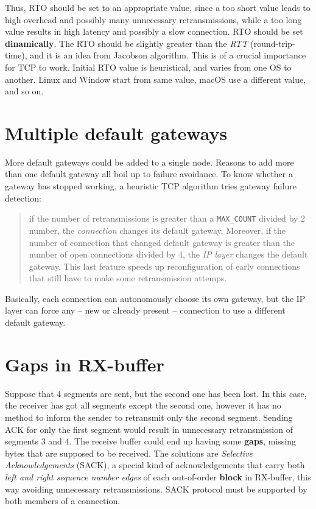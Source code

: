 \documentclass[a4paper, 11pt]{report}
\begin{document}
Thus, RTO should be set to an appropriate value, since a too short value leads
to high overhead and possibly many unnecessary retransmissions, while a too
long value results in high latency and possibly a slow connection. RTO should
be set \textbf{dinamically}. The RTO should be slightly greater than the
\emph{RTT} (round-trip-time), and it is an idea from Jacobson algorithm. This
is of a crucial importance for TCP to work. Initial RTO value is heuristical,
and varies from one OS to another. Linux and Window start from same value,
macOS use a different value, and so on.

\section{Multiple default gateways}

More default gateways could be added to a single node. Reasons to add more than
one default gateway all boil up to failure avoidance. To know whether a gateway
has stopped working, a heuristic TCP algorithm tries gateway failure detection:

\begin{quote}
	if the number of retransmissions is greater than a \texttt{MAX\_COUNT}
	divided by 2 number, the \emph{connection} changes its default gateway.
	Moreover, if the number of connection that changed default gateway is
	greater than the number of open connections divided by 4, the \emph{IP
	layer} changes the default gateway. This last feature speeds up
	reconfiguration of early connections that still have to make some
	retransmission attemps.
\end{quote}

Basically, each connection can autonomously choose its own gateway, but the IP
layer can force any \--- new or already present \--- connection to use a
different default gateway.

\section{Gaps in RX-buffer}

Suppose that 4 segments are sent, but the second one has been lost. In this
case, the receiver has got all segments except the second one, however it has
no method to inform the sender to retransmit only the second segment. Sending
ACK for only the first segment would result in unnecessary retransmission of
segments 3 and 4. The receive buffer could end up having some \textbf{gaps},
missing bytes that are supposed to be received. The solutions are
\emph{Selective Acknowledgements} (SACK), a special kind of acknowledgements
that carry both \emph{left and right sequence number edges} of each
out-of-order \textbf{block} in RX-buffer, this way avoiding unnecessary
retransmissions. SACK protocol must be supported by both members of a
connection.
\end{document}
